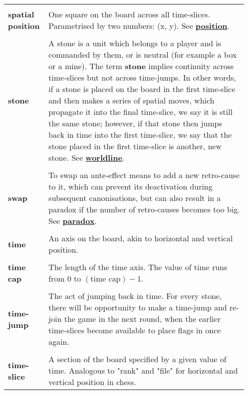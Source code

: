 {\begin{longtable}{ R{0.15\linewidth}  L{0.81\linewidth}  }
 \\* \textbf{spatial position} & \parbox[t]{\linewidth}{One square on the board across all time-slices. Parametrised by two numbers: (x, y). See \hyperref[glossary:position]{\textbf{position}}.}\\
 \\* \textbf{stone} & \parbox[t]{\linewidth}{A stone is a unit which belongs to a player and is commanded by them, or is neutral (for example a box or a mine). The term \textbf{stone} implies continuity across time-slices but not across time-jumps. In other words, if a stone is placed on the board in the first time-slice and then makes a series of spatial moves, which propagate it into the final time-slice, we say it is still the same stone; however, if that stone then jumps back in time into the first time-slice, we say that the stone placed in the first time-slice is another, new stone. See \hyperref[glossary:worldline]{\textbf{worldline}}.}\\
 \\* \textbf{swap} & \parbox[t]{\linewidth}{To swap an ante-effect means to add a new retro-cause to it, which can prevent its deactivation during subsequent canonisations, but can also result in a paradox if the number of retro-causes becomes too big. See \hyperref[glossary:paradox]{\textbf{paradox}}.}\\
 \\* \textbf{time} & \parbox[t]{\linewidth}{An axis on the board, akin to horizontal and vertical position.}\\
 \\* \textbf{time cap} & \parbox[t]{\linewidth}{The length of the time axis. The value of time runs from $0$ to $(\text{time cap}) - 1$.}\\
 \\* \textbf{time-jump} & \parbox[t]{\linewidth}{The act of jumping back in time. For every stone, there will be opportunity to make a time-jump and re-join the game in the next round, when the earlier time-slices become available to place flags in once again.}\\
 \\* \textbf{time-slice} & \parbox[t]{\linewidth}{A section of the board specified by a given value of time. Analogous to "rank" and "file" for horizontal and vertical position in chess.}\\

\end{longtable}}
